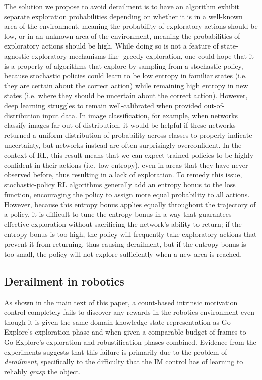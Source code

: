 \documentclass{nature}
\renewcommand*{\cite}[1]{\supercite{#1}}
\begin{document}
The solution we propose to avoid derailment is to have an algorithm exhibit separate exploration probabilities depending on whether it is in a well-known area of the environment, meaning the probability of exploratory actions should be low, or in an unknown area of the environment, meaning the probabilities of exploratory actions should be high.
While doing so is not a feature of state-agnostic exploratory mechanisms like -greedy exploration, one could hope that it is a property of algorithms that explore by sampling from a stochastic policy, because stochastic policies could learn to be low entropy in familiar states (i.e. they are certain about the correct action) while remaining high entropy in new states (i.e. where they should be uncertain about the correct action).
However, deep learning struggles to remain well-calibrated when provided out-of-distribution input data. 
In image classification, for example, when networks classify images far out of distribution, it would be helpful if these networks returned a uniform distribution of probability across classes to properly indicate uncertainty, but networks instead are often surprisingly overconfident\cite{nguyen2015deep, szegedy:corr13}.
In the context of RL, this result means that we can expect trained policies to be highly confident in their actions (i.e.\ low entropy), even in areas that they have never observed before, thus resulting in a lack of exploration.
To remedy this issue, stochastic-policy RL algorithms generally add an entropy bonus to the loss function, encouraging the policy to assign more equal probability to all actions.
However, because this entropy bonus applies equally throughout the trajectory of a policy, it is difficult to tune the entropy bonus in a way that guarantees effective exploration without sacrificing the network's ability to return; if the entropy bonus is too high, the policy will frequently take exploratory actions that prevent it from returning, thus causing derailment, but if the entropy bonus is too small, the policy will not explore sufficiently when a new area is reached.






\subsection{Derailment in robotics}

As shown in the main text of this paper, a count-based intrinsic motivation control completely fails to discover any rewards in the robotics environment even though it is given the same domain knowledge state representation as Go-Explore's exploration phase and when given a comparable budget of frames to Go-Explore's exploration and robustification phases combined. 
Evidence from the experiments suggests that this failure is primarily due to the problem of \emph{derailment}, specifically to the difficulty that the IM control has of learning to reliably \emph{grasp} the object.
\end{document}

